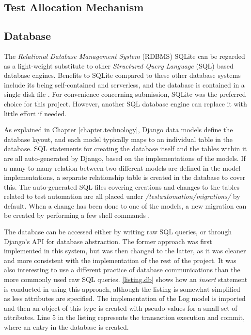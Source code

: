 \subsection{Test Allocation Mechanism}


\subsection{Database}

The \emph{Relational Database Management System} (RDBMS) SQLite can be regarded as a light-weight substitute to other \emph{Structured Query Language} (SQL) based database engines. Benefits to SQLite compared to these other database systems include its being self-contained and serverless, and the database is contained in a single disk file \cite{https://www.sqlite.org/about.html}. For convenience concerning submission, SQLite was the preferred choice for this project. However, another SQL database engine can replace it with little effort if needed.

As explained in Chapter \ref{chapter.technology}, Django data models define the database layout, and each model typically maps to an individual table in the database. SQL statements for creating the database itself and the tables within it are all auto-generated by Django, based on the implementations of the models. If a many-to-many relation between two different models are defined in the model implementations, a separate relationship table is created in the database to cover this. The auto-generated SQL files covering creations and changes to the tables related to test automation are all placed under \emph{/testautomation/migrations/} by default. When a change has been done to one of the models, a new migration can be created by performing a few shell commands \cite{https://docs.djangoproject.com/en/1.9/topics/migrations/}.

The database can be accessed either by writing raw SQL queries, or through Django's API for database abstraction. The former approach was first implemented in this system, but was then changed to the latter, as it was cleaner and more consistent with the implementation of the rest of the project. It was also interesting to use a different practice of database communications than the more commonly used raw SQL queries. \lstlistingname \space \ref{listing.db} shows how an \emph{insert} statement is conducted in \toolname \space using this approach, although the listing is somewhat simplified as less attributes are specified. The implementation of the Log model is imported and then an object of this type is created with pseudo values for a small set of attributes. Line 5 in the listing represents the transaction execution and commit, where an entry in the database is created.

